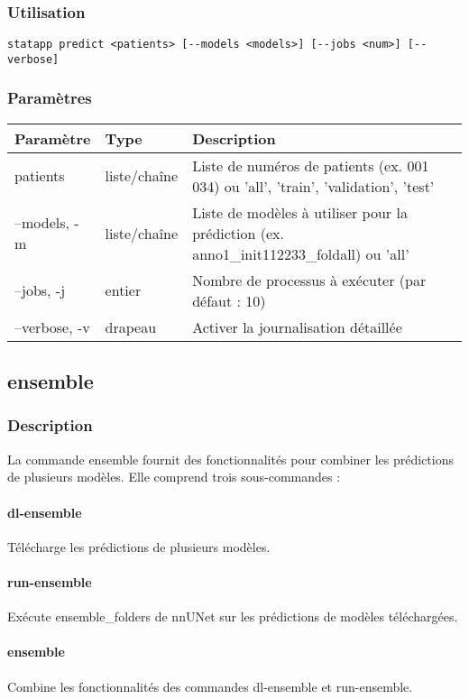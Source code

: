 \documentclass{article}
\begin{document}
\subsubsection{Utilisation}
\begin{lstlisting}
statapp predict <patients> [--models <models>] [--jobs <num>] [--verbose]
\end{lstlisting}

\subsubsection{Paramètres}
\begin{tabulary}{\linewidth}{LLL}
\toprule
\textbf{Paramètre} & \textbf{Type} & \textbf{Description} \\
\midrule
patients & liste/chaîne & Liste de numéros de patients (ex. 001 034) ou 'all', 'train', 'validation', 'test' \\
--models, -m & liste/chaîne & Liste de modèles à utiliser pour la prédiction (ex. anno1\_init112233\_foldall) ou 'all' \\
--jobs, -j & entier & Nombre de processus à exécuter (par défaut : 10) \\
--verbose, -v & drapeau & Activer la journalisation détaillée \\
\bottomrule
\end{tabulary}

\subsection{ensemble}
\subsubsection{Description}
La commande ensemble fournit des fonctionnalités pour combiner les prédictions de plusieurs modèles. Elle comprend trois sous-commandes :

\paragraph{dl-ensemble}
Télécharge les prédictions de plusieurs modèles.

\paragraph{run-ensemble}
Exécute ensemble\_folders de nnUNet sur les prédictions de modèles téléchargées.

\paragraph{ensemble}
Combine les fonctionnalités des commandes dl-ensemble et run-ensemble.
\end{document}

